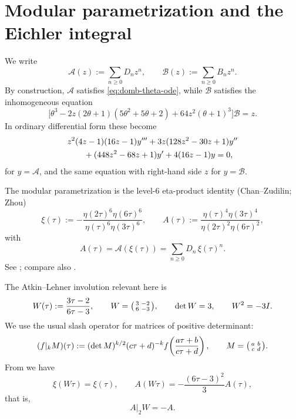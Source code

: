 \documentclass[11pt]{amsart}
\theoremstyle{definition}
\theoremstyle{remark}
\newcommand{\etaf}{\eta}
\newcommand{\thet}{\theta}
\newcommand{\sm}[4]{\begin{psmallmatrix}#1&#2\\#3&#4\end{psmallmatrix}}
\begin{document}
\section{Modular parametrization and the Eichler integral}\label{sec:modular}

We write
\[
\mathcal A(z):=\sum_{n\ge 0}D_nz^n,
\qquad
\mathcal B(z):=\sum_{n\ge 0}B_nz^n.
\]
By construction, $\mathcal A$ satisfies \eqref{eq:domb-theta-ode}, while $\mathcal B$ satisfies the inhomogeneous equation
\begin{equation}\label{eq:B-theta-inhom}
\bigl[\thet^3-2z(2\thet+1)(5\thet^2+5\thet+2)+64z^2(\thet+1)^3\bigr]\mathcal B=z.
\end{equation}
In ordinary differential form these become
\begin{align}
&z^2(4z-1)(16z-1)y''' + 3z(128z^2-30z+1)y'' \notag\\
&\qquad + (448z^2-68z+1)y' +4(16z-1)y =0,
\label{eq:A-ordinary}
\end{align}
for $y=\mathcal A$, and the same equation with right-hand side $z$ for $y=\mathcal B$.

The modular parametrization is the level-$6$ eta-product identity (Chan--Zudilin; Zhou)
\begin{equation}\label{eq:xi-def}
\xi(\tau):=-\frac{\etaf(2\tau)^6\etaf(6\tau)^6}{\etaf(\tau)^6\etaf(3\tau)^6},
\qquad
A(\tau):=\frac{\etaf(\tau)^4\etaf(3\tau)^4}{\etaf(2\tau)^2\etaf(6\tau)^2},
\end{equation}
with
\begin{equation}\label{eq:domb-param}
A(\tau)=\mathcal A(\xi(\tau))=\sum_{n\ge 0}D_n\,\xi(\tau)^n.
\end{equation}
See \cite[(3.2)--(3.7)]{Zhou1911}; compare also \cite{BSWZ}.

The Atkin--Lehner involution relevant here is
\begin{equation}\label{eq:W-def}
W(\tau):=\frac{3\tau-2}{6\tau-3},
\qquad
W=\sm{3}{-2}{6}{-3},
\qquad
\det W=3,
\qquad
W^2=-3I.
\end{equation}
We use the usual slash operator for matrices of positive determinant:
\[
(f|_k M)(\tau):=(\det M)^{k/2}(c\tau+d)^{-k}f\!\left(\frac{a\tau+b}{c\tau+d}\right),
\qquad M=\sm{a}{b}{c}{d}.
\]
From \cite[(3.4), (3.7)]{Zhou1911} we have
\begin{equation}\label{eq:xi-A-W}
\xi(W\tau)=\xi(\tau),
\qquad
A(W\tau)=-\frac{(6\tau-3)^2}{3}A(\tau),
\end{equation}
that is,
\begin{equation}\label{eq:A-slash-W}
A|_2W=-A.
\end{equation}
\end{document}

